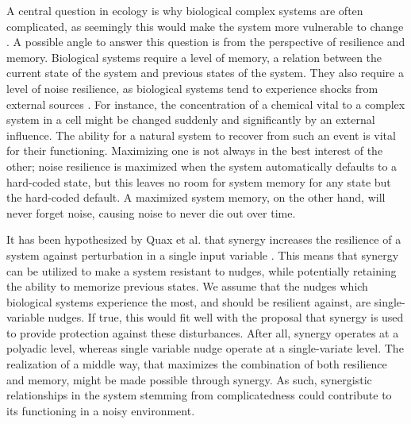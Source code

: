 \documentclass[../main.tex]{subfiles}
\begin{document}
A central question in ecology is why biological complex systems are often complicated, as seemingly this would make the system more vulnerable to change \cite{kondoh2003foraging, macarthur1955fluctuations}.
A possible angle to answer this question is from the perspective of resilience and memory.
Biological systems require a level of memory, a relation between the current state of the system and previous states of the system.
They also require a level of noise resilience, as biological systems tend to experience shocks from external sources \cite{peixoto2012emergence}. %
For instance, the concentration of a chemical vital to a complex system in a cell might be changed suddenly and significantly by an external influence.
The ability for a natural system to recover from such an event is vital for their functioning.
Maximizing one is not always in the best interest of the other; noise resilience is maximized when the system automatically defaults to a hard-coded state, but this leaves no room for system memory for any state but the hard-coded default.
A maximized system memory, on the other hand, will never forget noise, causing noise to never die out over time.

It has been hypothesized by Quax et al. that synergy increases the resilience of a system against perturbation in a single input variable \cite{quax2017quantifying}.
This means that synergy can be utilized to make a system resistant to nudges, while potentially retaining the ability to memorize previous states.
We assume that the nudges which biological systems experience the most, and should be resilient against, are single-variable nudges.
If true, this would fit well with the proposal that synergy is used to provide protection against these disturbances.
After all, synergy operates at a polyadic level, whereas single variable nudge operate at a single-variate level.
The realization of a middle way, that maximizes the combination of both resilience and memory, might be made possible through synergy.
As such, synergistic relationships in the system stemming from complicatedness could contribute to its functioning in a noisy environment.
\end{document}
